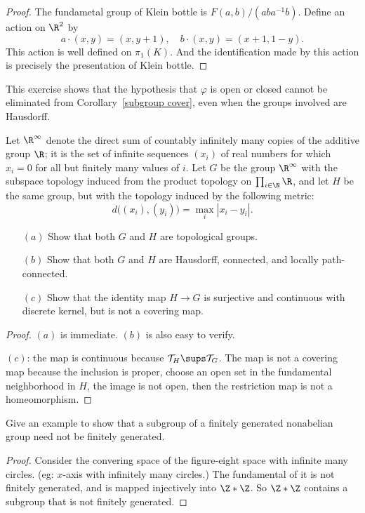 \begin{proof}
The fundametal group of Klein bottle is $F(a,b)/(aba^{-1}b)$. Define an action on $\R^2$ by
\[a\cdot(x,y)=(x,y+1),\quad b\cdot(x,y)=(x+1,1-y).\]
This action is well defined on $\pi_1(K)$. And the identification made by this action is precisely the presentation of Klein bottle.
\end{proof}
\begin{exercise}
This exercise shows that the hypothesis that $\varphi$ is open or closed cannot be
eliminated from Corollary~\ref{subgroup cover}, even when the groups involved are Hausdorff.\par
Let $\R^{\infty}$ denote the direct sum of countably infinitely many copies of the additive group $\R$; it is the set of infinite sequences $(x_i)$ of real numbers
for which $x_i=0$ for all but finitely many values of $i$. Let $G$ be the group $\R^\infty$ with the subspace topology induced from the product topology on $\prod_{i\in\N}\R$, and let $H$ be the same group, but with the topology induced by the following metric:
\[d\big((x_i),(y_i)\big)=\max_i|x_i-y_i|.\]
\begin{itemize}
\item[$(a)$]Show that both $G$ and $H$ are topological groups.
\item[$(b)$]Show that both $G$ and $H$ are Hausdorff, connected, and locally path-connected.
\item[$(c)$]Show that the identity map $H\to G$ is surjective and continuous with
discrete kernel, but is not a covering map.
\end{itemize}
\end{exercise}
\begin{proof}
$(a)$ is immediate. $(b)$ is also easy to verify.\par
$(c)$: the map is continuous because $\mathcal{T}_H\sups\mathcal{T}_G$. The map is not a covering map because the inclusion is proper, choose an open set in the fundamental neighborhood in $H$, the image is not open, then the restriction map is not a homeomorphism.
\end{proof}
\begin{exercise}
Give an example to show that a subgroup of a finitely generated nonabelian group need not be finitely generated.
\end{exercise}
\begin{proof}
Consider the convering space of the figure-eight space with infinite many circles. (eg: $x$-axis with infinitely many circles.) The fundamental of it is not finitely generated, and is mapped injectively into $\Z\ast\Z$. So $\Z\ast\Z$ contains a subgroup that is not finitely generated.
\end{proof}
